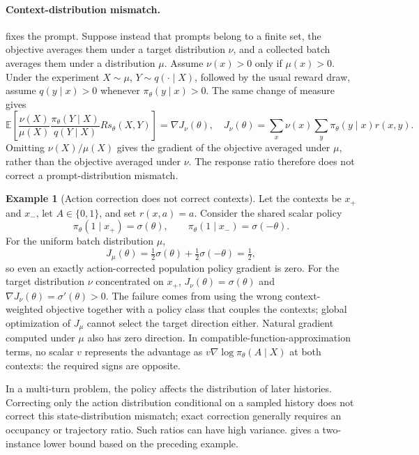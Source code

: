 \documentclass[11pt,twoside]{article}
\newcommand{\E}{\mathbb E}
\theoremstyle{definition}
\newtheorem{example}[theorem]{Example}
\theoremstyle{remark}
\begin{document}
\paragraph{Context-distribution mismatch.}
 fixes the prompt. Suppose instead that prompts belong
to a finite set, the objective averages them under a target distribution
$\nu$, and a collected batch averages them under a distribution $\mu$.
Assume $\nu(x)>0$ only if $\mu(x)>0$. Under the experiment
$X\sim\mu$, $Y\sim q(\cdot\mid X)$, followed by the usual reward draw,
assume $q(y\mid x)>0$ whenever $\pi_\theta(y\mid x)>0$. The same change of
measure gives
\begin{equation}
 \E\!\left[
 \frac{\nu(X)}{\mu(X)}
 \frac{\pi_\theta(Y\mid X)}{q(Y\mid X)}
 R s_\theta(X,Y)
 \right]
 =\nabla J_\nu(\theta),
 \quad
 J_\nu(\theta)=\sum_x\nu(x)
 \sum_y\pi_\theta(y\mid x)r(x,y).
 \label{eq:context-importance}
\end{equation}
Omitting $\nu(X)/\mu(X)$ gives the gradient of the objective averaged under
$\mu$, rather than the objective averaged under $\nu$. The response ratio
therefore does not correct a prompt-distribution mismatch.

\begin{example}[Action correction does not correct contexts]
\label{ex:offpolicy-context}
Let the contexts be $x_+$ and $x_-$, let $A\in\{0,1\}$, and set
$r(x,a)=a$. Consider the shared scalar policy
\[
 \pi_\theta(1\mid x_+)=\sigma(\theta),\qquad
 \pi_\theta(1\mid x_-)=\sigma(-\theta).
\]
For the uniform batch distribution $\mu$,
\[
 J_\mu(\theta)
 =\tfrac12\sigma(\theta)+\tfrac12\sigma(-\theta)
 =\tfrac12,
\]
so even an exactly action-corrected population policy gradient is zero.
For the target distribution $\nu$ concentrated on $x_+$,
$J_\nu(\theta)=\sigma(\theta)$ and $\nabla J_\nu(\theta)=\sigma'(\theta)>0$.
The failure comes from using the wrong context-weighted objective together
with a policy class that couples the contexts; global optimization of
$J_\mu$ cannot select the target direction either. Natural gradient computed
under $\mu$ also has zero direction. In compatible-function-approximation
terms, no scalar $v$ represents the advantage as
$v\nabla\log\pi_\theta(A\mid X)$ at both contexts: the required signs are
opposite.
\end{example}

In a multi-turn problem, the policy affects the distribution of later
histories. Correcting only the action distribution conditional on a sampled
history does not correct this state-distribution mismatch; exact correction
generally requires an occupancy or trajectory ratio. Such ratios can have
high variance.  gives a two-instance lower
bound based on the preceding example.
\end{document}
